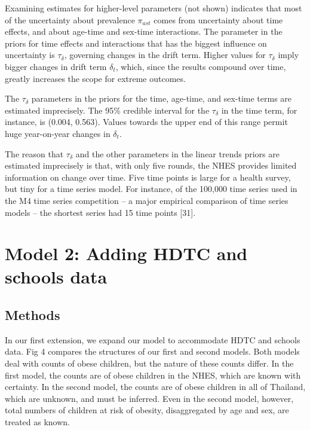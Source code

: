\documentclass[10pt,letterpaper]{article}
\begin{document}
Examining estimates for higher-level parameters (not shown) indicates
that most of the uncertainty about prevalence \(\pi_{ast}\) comes from
uncertainty about time effects, and about age-time and sex-time
interactions. The parameter in the priors for time effects and
interactions that has the biggest influence on uncertainty is
\(\tau_{\delta}\), governing changes in the drift term. Higher values
for \(\tau_{\delta}\) imply bigger changes in drift term \(\delta_t\),
which, since the results compound over time, greatly increases the scope
for extreme outcomes.

The \(\tau_{\delta}\) parameters in the priors for the time, age-time,
and sex-time terms are estimated imprecisely. The 95\% credible interval
for the \(\tau_{\delta}\) in the time term, for instance, is (0.004,
0.563). Values towards the upper end of this range permit huge
year-on-year changes in \(\delta_t\).

The reason that \(\tau_{\delta}\) and the other parameters in the linear
trends priors are estimated imprecisely is that, with only five rounds,
the NHES provides limited information on change over time. Five time
points is large for a health survey, but tiny for a time series model.
For instance, of the 100,000 time series used in the M4 time series
competition -- a major empirical comparison of time series models -- the
shortest series had 15 time points {[}31{]}.

\hypertarget{model-2-adding-hdtc-and-schools-data}{%
\section{Model 2: Adding HDTC and schools
data}\label{model-2-adding-hdtc-and-schools-data}}

\hypertarget{methods-1}{%
\subsection{Methods}\label{methods-1}}

In our first extension, we expand our model to accommodate HDTC and
schools data. Fig 4 compares the structures of our first and second
models. Both models deal with counts of obese children, but the nature
of these counts differ. In the first model, the counts are of obese
children in the NHES, which are known with certainty. In the second
model, the counts are of obese children in all of Thailand, which are
unknown, and must be inferred. Even in the second model, however, total
numbers of children at risk of obesity, disaggregated by age and sex,
are treated as known.
\end{document}
